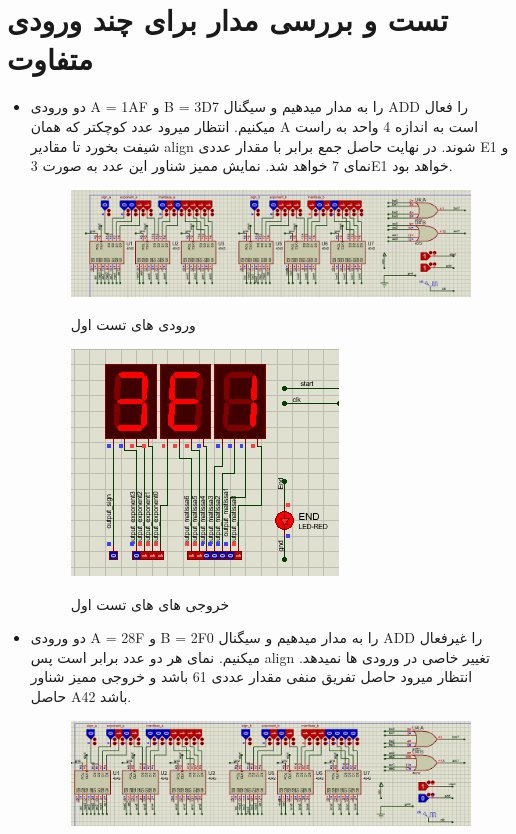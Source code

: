 \documentclass[twoside]{article}
\begin{document}
	\section*{تست و بررسی مدار برای چند ورودی متفاوت}
	\begin{itemize}
		\item
		دو ورودی A = 1AF و B = 3D7 را به مدار میدهیم و سیگنال ADD را فعال میکنیم. انتظار میرود عدد کوچکتر که همان A است به اندازه 4 واحد به راست شیفت بخورد تا مقادیر align شوند. در نهایت حاصل جمع برابر با مقدار عددی E1 و نمای 7 خواهد شد. نمایش ممیز شناور این عدد به صورت 3E1 خواهد بود.
		\begin{figure}[h!]
			\begin{center}
				\includegraphics[scale=0.5]{test1_inputs}‎
				\caption{ورودی های تست اول}
			\end{center}
		\end{figure} 
	\begin{figure}[h!]
		\begin{center}
			\includegraphics[scale=0.8]{test1_outputs}‎
			\caption{خروجی های های تست اول}
		\end{center}
	\end{figure} 
		\item
				دو ورودی A = 28F و B = 2F0 را به مدار میدهیم و سیگنال ADD را غیرفعال میکنیم. نمای هر دو عدد برابر است پس align تغییر خاصی در ورودی ها نمیدهد. انتظار میرود حاصل تفریق منفی مقدار عددی 61 باشد و خروجی ممیز شناور حاصل A42 باشد.
			\begin{figure}[h!]
				\begin{center}
					\includegraphics[scale=0.5]{test2_inputs}‎

\end{center}
\end{figure}
\end{itemize}
\end{document}
